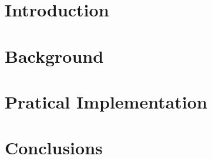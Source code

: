 \documentclass[twoside,11pt]{report}
\begin{document}
	\begin{comment}
		\ititle{My Title}
		\isubtitle{My Subtitle}
		\iauthor{Me and Myself}
		\idate{2004}
		\irefnr{IR-EE-SB 2000:099}
		\iaddress{Signal Processing\\
		School of Electrical Engineering\\
		Kungliga Tekniska Hgskolan}
		\makeititle
	\end{comment}
	
	\begin{comment}
		\chapter*{Abstract}
		\chapter*{Dedication}
		\chapter*{Acknowledgements}
	\end{comment}
	\tableofcontents

	\chapter{Introduction}
	
	\chapter{Background}
	
	\chapter{Pratical Implementation}
	\chapter{Conclusions}

	
\end{document}
